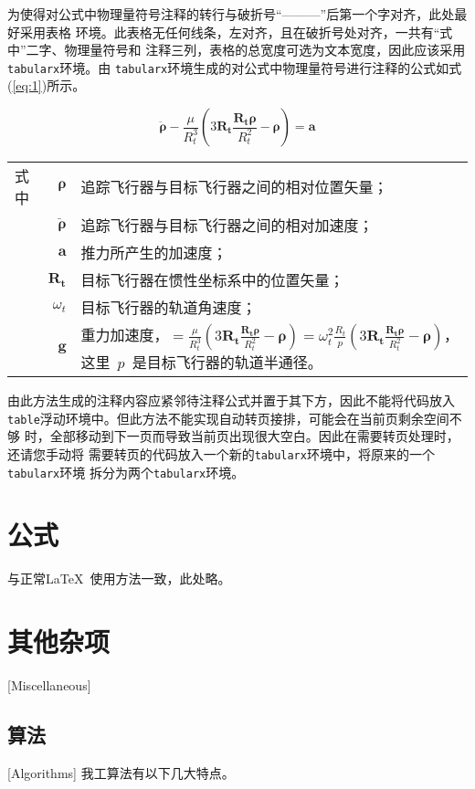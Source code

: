 为使得对公式中物理量符号注释的转行与破折号“———”后第一个字对齐，此处最好采用表格
环境。此表格无任何线条，左对齐，且在破折号处对齐，一共有“式中”二字、物理量符号和
注释三列，表格的总宽度可选为文本宽度，因此应该采用\verb|tabularx|环境。由
\verb|tabularx|环境生成的对公式中物理量符号进行注释的公式如式(\ref{eq:1})所示。

\begin{equation}\label{eq:1}
\ddot{\boldsymbol{\rho}}-\frac{\mu}{R_{t}^{3}}\left(3\mathbf{R_{t}}\frac{\mathbf{R_{t}\rho}}{R_{t}^{2}}-\boldsymbol{\rho}\right)=\mathbf{a}
\end{equation}
\begin{tabularx}{\textwidth}{@{}l@{\quad}r@{———}X@{}}
式中& $\boldsymbol{\rho}$ &追踪飞行器与目标飞行器之间的相对位置矢量；\\
&  $\boldsymbol{\ddot{\rho}}$&追踪飞行器与目标飞行器之间的相对加速度；\\
&  $\mathbf{a}$   &推力所产生的加速度；\\
&  $\mathbf{R_t}$ & 目标飞行器在惯性坐标系中的位置矢量；\\
&  $\omega_{t}$ & 目标飞行器的轨道角速度；\\
&  $\mathbf{g}$ & 重力加速度，$=\frac{\mu}{R_{t}^{3}}\left(
3\mathbf{R_{t}}\frac{\mathbf{R_{t}\rho}}{R_{t}^{2}}-\boldsymbol{\rho}\right)=\omega_{t}^{2}\frac{R_{t}}{p}\left(
3\mathbf{R_{t}}\frac{\mathbf{R_{t}\rho}}{R_{t}^{2}}-\boldsymbol{\rho}\right)$，这里~$p$~是目标飞行器的轨道半通径。
\end{tabularx}\vspace{\baselineskip}

由此方法生成的注释内容应紧邻待注释公式并置于其下方，因此不能将代码放入
\verb|table|浮动环境中。但此方法不能实现自动转页接排，可能会在当前页剩余空间不够
时，全部移动到下一页而导致当前页出现很大空白。因此在需要转页处理时，还请您手动将
需要转页的代码放入一个新的\verb|tabularx|环境中，将原来的一个\verb|tabularx|环境
拆分为两个\verb|tabularx|环境。

\section{公式}
与正常\LaTeX\ 使用方法一致，此处略。

\section{其他杂项}[Miscellaneous]

\subsection{算法}[Algorithms]
我工算法有以下几大特点。

